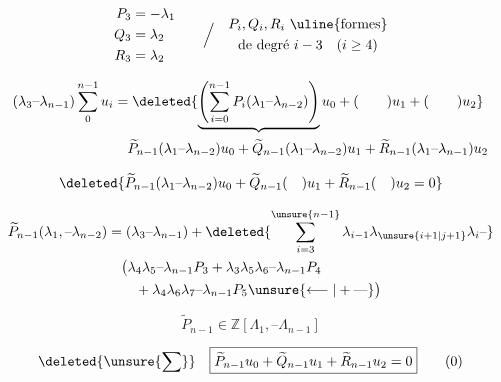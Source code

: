 \[
\begin{aligned}P_3&=-\lambda_1\\Q_3&=\lambda_2\\R_3&=\lambda_2\end{aligned}
\qquad\Big/\quad
\begin{gathered}P_i,Q_i,R_i\ \text{\uline{formes}}\\
\text{de degré }i-3\quad(i\geq4)\end{gathered}
\]

{\scriptsize
\[
\begin{aligned}
(\lambda_3\text{--}\lambda_{n-1})\sum_0^{n-1}u_i
&=\deleted{\underbrace{\left(\sum_{i=0}^{n-1}P_i(\lambda_1\text{--}\lambda_{n-2})\right)}u_0+(\qquad)u_1+(\qquad)u_2}\\
&\quad\widetilde P_{n-1}(\lambda_1\text{--}\lambda_{n-2})u_0+
 \widetilde Q_{n-1}(\lambda_1\text{--}\lambda_{n-2})u_1+
 \widetilde R_{n-1}(\lambda_1\text{--}\lambda_{n-1})u_2
\end{aligned}
\]
}

\[
\deleted{\widetilde P_{n-1}(\lambda_1\text{--}\lambda_{n-2})u_0+
\widetilde Q_{n-1}(\quad)u_1+\widetilde R_{n-1}(\quad)u_2=0}
\]

\[
\begin{aligned}
\widetilde P_{n-1}(\lambda_1,\text{--}\lambda_{n-2}) &=
(\lambda_3\text{--}\lambda_{n-1})+
\deleted{\sum_{i=3}^{\unsure{n-1}}\lambda_{i-1}\lambda_{\unsure{i+1|j+1}}\lambda_{i}\text{--}}\\
&\quad\big(\lambda_4\lambda_5\text{--}\lambda_{n-1}P_3
 +\lambda_3\lambda_5\lambda_6\text{--}\lambda_{n-1}P_4\\
&\qquad+\lambda_{4}\lambda_6\lambda_7\text{--}\lambda_{n-1}P_5\unsure{\longleftarrow|+\text{---}}\big)
\end{aligned}
\]


\[
\widetilde P_{n-1}\in\mathbb Z[\Lambda_1,\text{--}\Lambda_{n-1}]
\]

\[
\deleted{\unsure{\sum}}\quad
\boxed{\widetilde P_{n-1}u_0+\widetilde Q_{n-1}u_1+\widetilde R_{n-1}u_2=0}\tag*{(0)}
\]

\endgroup

